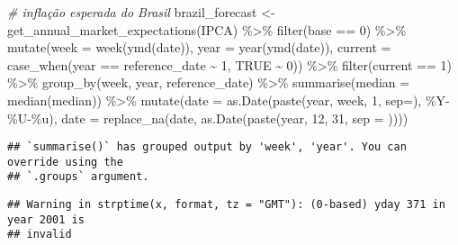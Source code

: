 \documentclass[
]{article}
\newenvironment{Shaded}{\begin{snugshade}}{\end{snugshade}}
\newcommand{\AttributeTok}[1]{\textcolor[rgb]{0.77,0.63,0.00}{#1}}
\newcommand{\CommentTok}[1]{\textcolor[rgb]{0.56,0.35,0.01}{\textit{#1}}}
\newcommand{\ConstantTok}[1]{\textcolor[rgb]{0.00,0.00,0.00}{#1}}
\newcommand{\DecValTok}[1]{\textcolor[rgb]{0.00,0.00,0.81}{#1}}
\newcommand{\FunctionTok}[1]{\textcolor[rgb]{0.00,0.00,0.00}{#1}}
\newcommand{\NormalTok}[1]{#1}
\newcommand{\OtherTok}[1]{\textcolor[rgb]{0.56,0.35,0.01}{#1}}
\newcommand{\SpecialCharTok}[1]{\textcolor[rgb]{0.00,0.00,0.00}{#1}}
\newcommand{\StringTok}[1]{\textcolor[rgb]{0.31,0.60,0.02}{#1}}
\begin{document}
\begin{Shaded}
\begin{Highlighting}[]
\CommentTok{\# inflação esperada do Brasil }
\NormalTok{brazil\_forecast }\OtherTok{\textless{}{-}} \FunctionTok{get\_annual\_market\_expectations}\NormalTok{(}\StringTok{\textquotesingle{}IPCA\textquotesingle{}}\NormalTok{) }\SpecialCharTok{\%\textgreater{}\%} 
  \FunctionTok{filter}\NormalTok{(base }\SpecialCharTok{==} \DecValTok{0}\NormalTok{) }\SpecialCharTok{\%\textgreater{}\%} 
  \FunctionTok{mutate}\NormalTok{(}\AttributeTok{week =} \FunctionTok{week}\NormalTok{(}\FunctionTok{ymd}\NormalTok{(date)), }
         \AttributeTok{year =} \FunctionTok{year}\NormalTok{(}\FunctionTok{ymd}\NormalTok{(date)),}
         \AttributeTok{current =} \FunctionTok{case\_when}\NormalTok{(year }\SpecialCharTok{==}\NormalTok{ reference\_date }\SpecialCharTok{\textasciitilde{}} \DecValTok{1}\NormalTok{, }
                             \ConstantTok{TRUE} \SpecialCharTok{\textasciitilde{}} \DecValTok{0}\NormalTok{)) }\SpecialCharTok{\%\textgreater{}\%}
  \FunctionTok{filter}\NormalTok{(current }\SpecialCharTok{==} \DecValTok{1}\NormalTok{) }\SpecialCharTok{\%\textgreater{}\%} 
  \FunctionTok{group\_by}\NormalTok{(week, year, reference\_date) }\SpecialCharTok{\%\textgreater{}\%} 
  \FunctionTok{summarise}\NormalTok{(}\AttributeTok{median =} \FunctionTok{median}\NormalTok{(median)) }\SpecialCharTok{\%\textgreater{}\%} 
  \FunctionTok{mutate}\NormalTok{(}\AttributeTok{date =} \FunctionTok{as.Date}\NormalTok{(}\FunctionTok{paste}\NormalTok{(year, week, }\DecValTok{1}\NormalTok{, }\AttributeTok{sep=}\StringTok{\textquotesingle{}{-}\textquotesingle{}}\NormalTok{), }\StringTok{\textquotesingle{}\%Y{-}\%U{-}\%u\textquotesingle{}}\NormalTok{),}
         \AttributeTok{date =} \FunctionTok{replace\_na}\NormalTok{(date, }\FunctionTok{as.Date}\NormalTok{(}\FunctionTok{paste}\NormalTok{(year, }\DecValTok{12}\NormalTok{, }\DecValTok{31}\NormalTok{, }\AttributeTok{sep =} \StringTok{\textquotesingle{}{-}\textquotesingle{}}\NormalTok{)))) }
\end{Highlighting}
\end{Shaded}

\begin{verbatim}
## `summarise()` has grouped output by 'week', 'year'. You can override using the
## `.groups` argument.
\end{verbatim}

\begin{verbatim}
## Warning in strptime(x, format, tz = "GMT"): (0-based) yday 371 in year 2001 is
## invalid
\end{verbatim}
\end{document}
